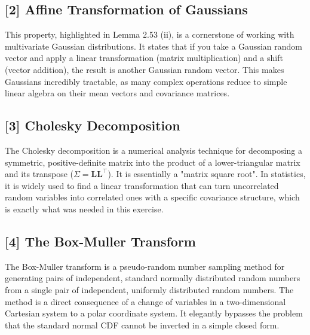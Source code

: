 \documentclass[11pt,a4paper]{article}
\newcommand{\mat}[1]{\mathbf{#1}}
\newcommand{\T}{\top}
\begin{document}
\subsection*{[2] Affine Transformation of Gaussians} \label{concept:affine}
This property, highlighted in Lemma 2.53 (ii), is a cornerstone of working with multivariate Gaussian distributions. It states that if you take a Gaussian random vector and apply a linear transformation (matrix multiplication) and a shift (vector addition), the result is another Gaussian random vector. This makes Gaussians incredibly tractable, as many complex operations reduce to simple linear algebra on their mean vectors and covariance matrices.

\subsection*{[3] Cholesky Decomposition} \label{concept:cholesky}
The Cholesky decomposition is a numerical analysis technique for decomposing a symmetric, positive-definite matrix into the product of a lower-triangular matrix and its transpose ($\Sigma = \mat{L}\mat{L}^\T$). It is essentially a "matrix square root". In statistics, it is widely used to find a linear transformation that can turn uncorrelated random variables into correlated ones with a specific covariance structure, which is exactly what was needed in this exercise.

\subsection*{[4] The Box-Muller Transform} \label{concept:boxmuller}
The Box-Muller transform is a pseudo-random number sampling method for generating pairs of independent, standard normally distributed random numbers from a single pair of independent, uniformly distributed random numbers. The method is a direct consequence of a change of variables in a two-dimensional Cartesian system to a polar coordinate system. It elegantly bypasses the problem that the standard normal CDF cannot be inverted in a simple closed form.
\end{document}
